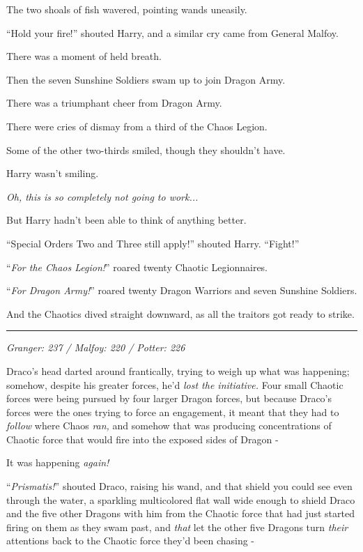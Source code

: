 The two shoals of fish wavered, pointing wands uneasily.

``Hold your fire!'' shouted Harry, and a similar cry came from General Malfoy.

There was a moment of held breath.

Then the seven Sunshine Soldiers swam up to join Dragon Army.

There was a triumphant cheer from Dragon Army.

There were cries of dismay from a third of the Chaos Legion.

Some of the other two-thirds smiled, though they shouldn't have.

Harry wasn't smiling.

\emph{Oh, this is so completely not going to work...}

But Harry hadn't been able to think of anything better.

``Special Orders Two and Three still apply!'' shouted Harry. ``Fight!''

``\emph{For the Chaos Legion!}'' roared twenty Chaotic Legionnaires.

``\emph{For Dragon Army!}'' roared twenty Dragon Warriors and seven Sunshine Soldiers.

And the Chaotics dived straight downward, as all the traitors got ready to strike.

\begin{center}\rule{3in}{0.4pt}\end{center}

\emph{Granger: 237 / Malfoy: 220 / Potter: 226}

Draco's head darted around frantically, trying to weigh up what was happening; somehow, despite his greater forces, he'd \emph{lost the initiative.} Four small Chaotic forces were being pursued by four larger Dragon forces, but because Draco's forces were the ones trying to force an engagement, it meant that they had to \emph{follow} where Chaos \emph{ran,} and somehow that was producing concentrations of Chaotic force that would fire into the exposed sides of Dragon -

It was happening \emph{again!}

``\emph{Prismatis!}'' shouted Draco, raising his wand, and that shield you could see even through the water, a sparkling multicolored flat wall wide enough to shield Draco and the five other Dragons with him from the Chaotic force that had just started firing on them as they swam past, and \emph{that} let the other five Dragons turn \emph{their} attentions back to the Chaotic force they'd been chasing -

